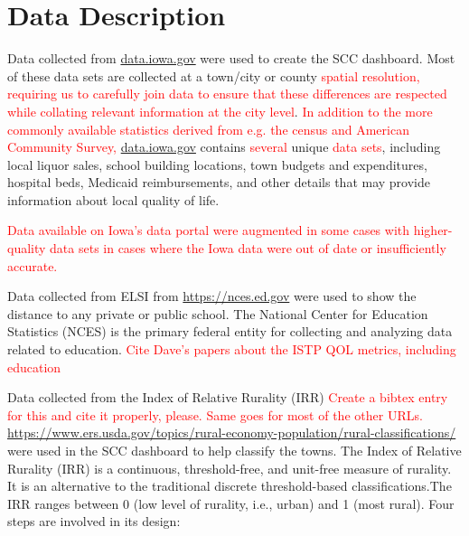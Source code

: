 \documentclass[letterpaper,inpress]{jdsart}
\begin{document}
\section{Data Description}

Data collected from \url{data.iowa.gov} were used to create the SCC dashboard. Most of these data sets are collected at a town/city or county {\textcolor{red}{spatial resolution, requiring us to carefully join data to ensure that these differences are respected while collating relevant information at the city level}}. {\textcolor{red}{In addition to the more commonly available statistics derived from e.g. the census and American Community Survey,}} \url{data.iowa.gov} contains {\textcolor{red}{several}} unique {\textcolor{red}{data sets}}, including local liquor sales, school building locations, town budgets and expenditures, hospital beds, Medicaid reimbursements, and other details that may provide information about local quality of life.

{\textcolor{red}{Data available on Iowa's data portal were augmented in some cases with higher-quality data sets in cases where the Iowa data were out of date or insufficiently accurate.}}

Data collected from ELSI from \url{https://nces.ed.gov} were used to show the distance to any private or public school. The National Center for Education Statistics (NCES) is the primary federal entity for collecting and analyzing data related to education.
{\textcolor{red}{Cite Dave's papers about the ISTP QOL metrics, including education}}

Data collected from the Index of Relative Rurality (IRR) {\textcolor{red}{Create a bibtex entry for this and cite it properly, please. Same goes for most of the other URLs.}} \url{https://www.ers.usda.gov/topics/rural-economy-population/rural-classifications/} were used in the SCC dashboard to help classify the towns. The Index of Relative Rurality (IRR) is a continuous, threshold-free, and unit-free measure of rurality. It is an alternative to the traditional discrete threshold-based classifications.The IRR ranges between 0 (low level of rurality, i.e., urban) and 1 (most rural). Four steps are involved in its design:
\end{document}

